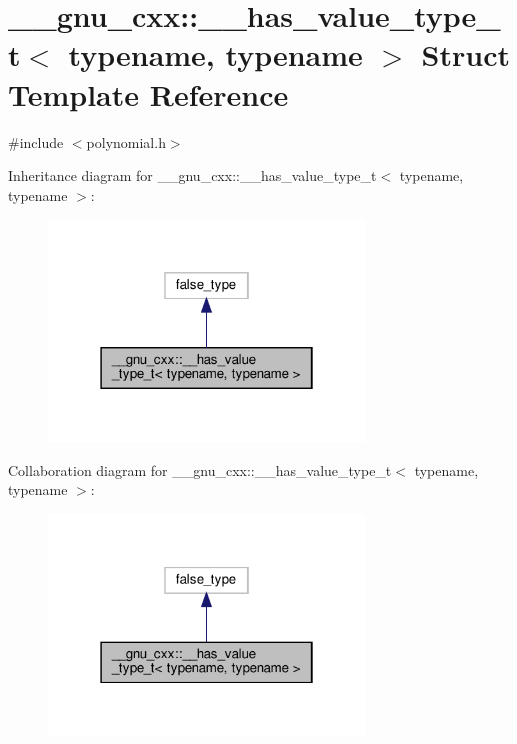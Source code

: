 \hypertarget{struct____gnu__cxx_1_1____has__value__type__t}{}\section{\+\_\+\+\_\+gnu\+\_\+cxx\+:\+:\+\_\+\+\_\+has\+\_\+value\+\_\+type\+\_\+t$<$ typename, typename $>$ Struct Template Reference}
\label{struct____gnu__cxx_1_1____has__value__type__t}


{\ttfamily \#include $<$polynomial.\+h$>$}



Inheritance diagram for \+\_\+\+\_\+gnu\+\_\+cxx\+:\+:\+\_\+\+\_\+has\+\_\+value\+\_\+type\+\_\+t$<$ typename, typename $>$\+:
\nopagebreak
\begin{figure}[H]
\begin{center}
\leavevmode
\includegraphics[width=238pt]{struct____gnu__cxx_1_1____has__value__type__t__inherit__graph}
\end{center}
\end{figure}


Collaboration diagram for \+\_\+\+\_\+gnu\+\_\+cxx\+:\+:\+\_\+\+\_\+has\+\_\+value\+\_\+type\+\_\+t$<$ typename, typename $>$\+:
\nopagebreak
\begin{figure}[H]
\begin{center}
\leavevmode
\includegraphics[width=238pt]{struct____gnu__cxx_1_1____has__value__type__t__coll__graph}
\end{center}
\end{figure}


